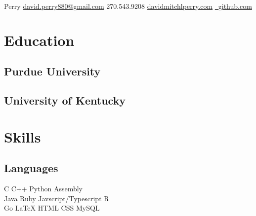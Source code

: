 \documentclass[]{deedy-resume-openfont}
\begin{document}
%
%

%
%


	    {Perry}
	    {\href{mailto:david.perry880@gmail.com}{david.perry880@gmail.com}}
	    {270.543.9208}
        {\href{https://davidmitchelperry.com}{davidmitchlperry.com}}
	    {\href{www.github.com}{\faGithub \  github.com}}

%
%

\begin{minipage}[t]{0.33\textwidth} 
	\vspace{-.2in}


\section{Education} 

\subsection{Purdue University}
\sectionsep


\subsection{University of Kentucky}
\sectionsep


\section{Skills}
\subsection{Languages}
C \textbullet{}   C++ \textbullet{} Python \textbullet{} Assembly \\
Java \textbullet{} Ruby \textbullet{} Javscript/Typescript \textbullet{} R \\
\textbullet{} Go \LaTeX \textbullet{} HTML \textbullet{} CSS \textbullet{} MySQL \\
\sectionsep


\end{minipage}
\end{document}
